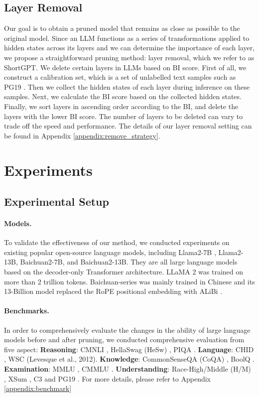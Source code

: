 		
		\subsection{Layer Removal}
		Our goal is to obtain a pruned model that remains as close as possible to the original model. Since an LLM functions as a series of transformations applied to hidden states across its layers and we can determine the importance of each layer, we propose a straightforward pruning method: layer removal, which we refer to as ShortGPT. We delete certain layers in LLMs based on BI score. First of all, we construct a calibration set, which is a set of unlabelled text samples such as PG19 \citep{rae2019compressive}. 
		Then we collect the hidden states of each layer during inference on these samples. Next, we calculate the BI score based on the collected hidden states. Finally, we sort layers in ascending order according to the BI, and delete the layers with the lower BI score. The number of layers to be deleted can vary to trade off the speed and performance. The details of our layer removal setting can be found in Appendix \ref{appendix:remove_strategy}.
		
		\section{Experiments}\label{exp}
		\subsection{Experimental Setup} \label{label:exp_setup}
		\paragraph{Models.}To validate the effectiveness of our method, we conducted experiments on existing popular open-source language models, including Llama2-7B \citep{touvron2023llama}, Llama2-13B, Baichuan2-7B, and Baichuan2-13B. They are all large language models based on the decoder-only Transformer architecture. LLaMA 2 was trained on more than 2 trillion tokens. Baichuan-series was mainly trained in Chinese and its 13-Billion model replaced the RoPE \citep{su2024roformer} positional embedding with ALiBi \citep{press2021train}. 
		
		\paragraph{Benchmarks.} In order to comprehensively evaluate the changes in the ability of large language models before and after pruning, we conducted comprehensive evaluation from five aspect: \textbf{Reasoning}: CMNLI \citep{li2024cmmlu}, HellaSwag (HeSw) \citep{zellers2019hellaswag}, PIQA \citep{bisk2020piqa}. \textbf{Language}: CHID \citep{zheng2019chid},  WSC (Levesque et al., 2012). \textbf{Knowledge}: CommonSenseQA (CoQA) \citep{reddy2019coqa}, BoolQ \citep{clark2019boolq}. \textbf{Examination}: MMLU \citep{hendrycks2020measuring}, CMMLU \citep{li2024cmmlu}. \textbf{Understanding}: Race-High/Middle (H/M) \citep{lai2017race}, XSum \citep{hasan2021xl}, C3 \citep{sun2020investigating} and PG19 \citep{rae2019compressive}. For more details, please refer to Appendix \ref{appendix:benchmark}
		
